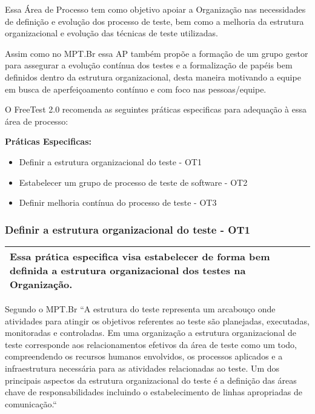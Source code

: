 Essa Área de Processo tem como objetivo apoiar a Organização nas necessidades de definição e evolução dos processo de teste, bem como a melhoria da estrutura organizacional e evolução das técnicas de teste utilizadas.

Assim como no MPT.Br \cite{GuiaMPTbr} essa AP também propõe a formação de um grupo gestor para assegurar a evolução contínua dos testes e a formalização de papéis bem definidos dentro da estrutura organizacional, desta maneira motivando a equipe em busca de aperfeiçoamento contínuo e com foco nas pessoas/equipe.


O FreeTest 2.0 recomenda as seguintes práticas especificas para adequação à essa área de processo:

\textbf{Práticas Especificas:}

\begin{itemize}    
    \item Definir a estrutura organizacional do teste - OT1
    \item Estabelecer um grupo de processo de teste de software - OT2
    \item Definir melhoria contínua do processo de teste - OT3
\end{itemize}

\subsubsection{Definir a estrutura organizacional do teste - OT1}
\label{sec:tca1}

\begin{table}[H]
\centering
\begin{tabular}{|p{130mm}|}
\hline
 Essa prática especifica visa estabelecer de forma bem definida a estrutura organizacional dos testes na Organização.\\ 
\hline
\end{tabular}
\end{table}

Segundo o MPT.Br \cite{GuiaMPTbr} “A estrutura do teste representa um arcabouço onde atividades para atingir os objetivos referentes ao teste são planejadas, executadas, monitoradas e controladas. Em uma organização a estrutura organizacional de teste corresponde aos relacionamentos efetivos da área de teste como um todo, compreendendo os recursos humanos envolvidos, os processos aplicados e a infraestrutura necessária para as atividades relacionadas ao teste. Um dos principais aspectos da estrutura organizacional do teste é a definição das áreas chave de responsabilidades incluindo o estabelecimento de linhas apropriadas de comunicação.“

